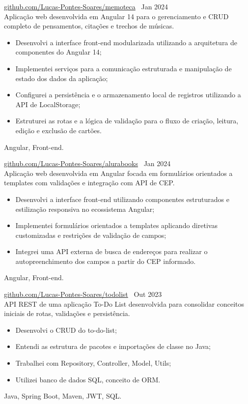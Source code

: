  \textbar{}  \href{https://github.com/Lucas-Pontes-Soares/memoteca}{github.com/Lucas-Pontes-Soares/memoteca} \hfill\ Jan 2024 \\
Aplicação web desenvolvida em Angular 14 para o gerenciamento e CRUD completo de pensamentos, citações e trechos de músicas.
\begin{itemize}
    \item Desenvolvi a interface front-end modularizada utilizando a arquitetura de componentes do Angular 14;
    \item Implementei serviços para a comunicação estruturada e manipulação de estado dos dados da aplicação;
    \item Configurei a persistência e o armazenamento local de registros utilizando a API de LocalStorage;
    \item Estruturei as rotas e a lógica de validação para o fluxo de criação, leitura, edição e exclusão de cartões.
\end{itemize}
 Angular, Front-end.

        
 \textbar{}  \href{https://github.com/Lucas-Pontes-Soares/alurabooks}{github.com/Lucas-Pontes-Soares/alurabooks} \hfill\ Jan 2024 \\
Aplicação web desenvolvida em Angular focada em formulários orientados a templates com validações e integração com API de CEP.
\begin{itemize}
    \item Desenvolvi a interface front-end utilizando componentes estruturados e estilização responsiva no ecossistema Angular;
    \item Implementei formulários orientados a templates aplicando diretivas customizadas e restrições de validação de campos;
    \item Integrei uma API externa de busca de endereços para realizar o autopreenchimento dos campos a partir do CEP informado.
\end{itemize}
 Angular, Front-end.

        
 \textbar{}  \href{https://github.com/Lucas-Pontes-Soares/todolist}{github.com/Lucas-Pontes-Soares/todolist} \hfill\ Out 2023 \\
API REST de uma aplicação To-Do List desenvolvida para consolidar conceitos iniciais de rotas, validações e persistência.
\begin{itemize}
    \item Desenvolvi o CRUD do to-do-list;
    \item Entendi as estrutura de pacotes e importações de classe no Java;
    \item Trabalhei com Repository, Controller, Model, Utils;
    \item Utilizei banco de dados SQL, conceito de ORM.
\end{itemize}
 Java, Spring Boot, Maven, JWT, SQL.

